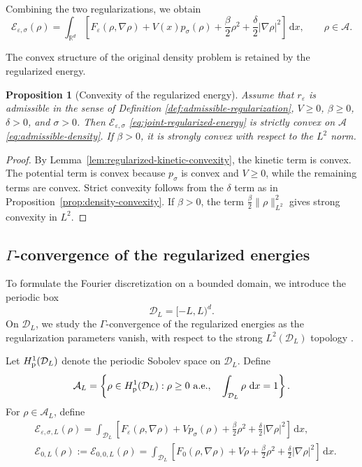 \documentclass[11pt]{article}
\newcommand{\R}{\mathbb{R}}
\newcommand{\A}{\mathcal{A}}
\newcommand{\E}{\mathcal{E}}
\newcommand{\dd}{\,\mathrm{d}}
\newcommand{\eps}{\varepsilon}
\newcommand{\sig}{\sigma}
\theoremstyle{plain}
\newtheorem{proposition}[theorem]{Proposition}
\theoremstyle{definition}
\numberwithin{equation}{section}
\begin{document}
Combining the two regularizations, we obtain
\begin{equation}
\label{eq:joint-regularized-energy}
\E_{\eps,\sig}(\rho)
=
\int_{\R^d}
\left[
F_\eps(\rho,\nabla\rho)
+V(x)p_\sig(\rho)
+\frac{\beta}{2}\rho^2
+\frac{\delta}{2}|\nabla\rho|^2
\right]\dd x,
\qquad
\rho\in\A.
\end{equation}

The convex structure of the original density problem is retained by
the regularized energy.

\begin{proposition}[Convexity of the regularized energy]
\label{prop:joint-convexity}
Assume that $r_\eps$ is admissible in the sense of Definition \ref{def:admissible-regularization}, $V\ge0$, $\beta\ge0$,
$\delta>0$, and $\sig>0$.
Then $\E_{\eps,\sig}$ \eqref{eq:joint-regularized-energy} is strictly convex on $\A$ \eqref{eq:admissible-density}.
If $\beta>0$, it is strongly convex with respect to the $L^2$ norm.
\end{proposition}

\begin{proof}
By Lemma~\ref{lem:regularized-kinetic-convexity}, the kinetic
term is convex. The potential term is convex because
$p_\sig$ is convex and $V\ge0$, while the remaining terms are convex.
Strict convexity follows from the $\delta$ term as in
Proposition~\ref{prop:density-convexity}. If $\beta>0$, the term
$\frac{\beta}{2}\|\rho\|_{L^2}^2$ gives strong convexity in $L^2$.
\end{proof}




\subsection{\texorpdfstring{$\Gamma$}{Gamma}-convergence of the regularized energies}

To formulate the Fourier discretization on a bounded domain, we introduce
the periodic box
\[
\mathcal D_L=[-L,L)^d.
\]
On $\mathcal D_L$, we study the $\Gamma$-convergence of the regularized
energies as the regularization parameters vanish, with respect to the
strong $L^2(\mathcal D_L)$ topology \cite{Braides2002}.

Let $H^1_{\rm p}(\mathcal D_L)$ denote the periodic Sobolev space on
$\mathcal D_L$.
Define
\begin{equation}
\label{eq:admissible-density-box}
\A_L
=
\left\{
\rho\in H^1_{\rm p}(\mathcal D_L):
\rho\ge0\ {\rm a.e.},
\quad
\int_{\mathcal D_L}\rho\,\dd x=1
\right\}.
\end{equation}
For $\rho\in\A_L$, define
\begin{equation}
\label{eq:energies-DL}
\begin{aligned}
&\E_{\eps,\sig,L}(\rho)
=
\int_{\mathcal D_L}
\left[
F_\eps(\rho,\nabla\rho)
+Vp_\sig(\rho)
+\frac{\beta}{2}\rho^2
+\frac{\delta}{2}|\nabla\rho|^2
\right]\dd x, \\
&\E_{0,L}(\rho)
:=\E_{0,0,L}(\rho) =
\int_{\mathcal D_L}
\left[
F_0(\rho,\nabla\rho)
+V\rho
+\frac{\beta}{2}\rho^2
+\frac{\delta}{2}|\nabla\rho|^2
\right]\dd x. 
\end{aligned}
\end{equation}
\end{document}
